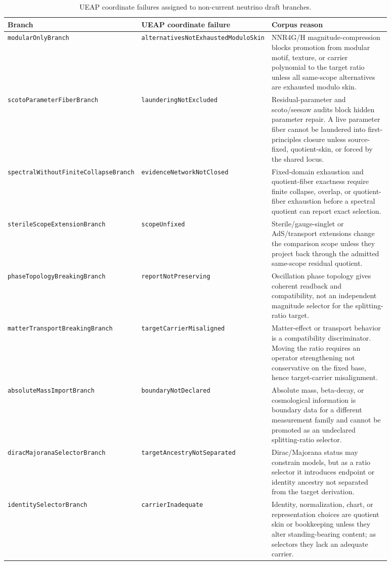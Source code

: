 \documentclass[11pt]{article}
\theoremstyle{definition}
\begin{document}
\begin{table}[htbp]
\centering
\small
\begin{tabular}{>{\raggedright\arraybackslash}p{0.24\linewidth}
                >{\raggedright\arraybackslash}p{0.25\linewidth}
                >{\raggedright\arraybackslash}p{0.39\linewidth}}
\toprule
Branch & UEAP coordinate failure & Corpus reason \\
\midrule
\texttt{modularOnlyBranch} &
\texttt{alternativesNotExhaustedModuloSkin} &
NNR4G/H magnitude-compression blocks promotion from modular motif, texture,
or carrier polynomial to the target ratio unless all same-scope alternatives
are exhausted modulo skin. \\
\addlinespace
\texttt{scotoParameterFiberBranch} &
\texttt{launderingNotExcluded} &
Residual-parameter and scoto/seesaw audits block hidden parameter repair. A
live parameter fiber cannot be laundered into first-principles closure unless
source-fixed, quotient-skin, or forced by the shared locus. \\
\addlinespace
\texttt{spectralWithoutFiniteCollapseBranch} &
\texttt{evidenceNetworkNotClosed} &
Fixed-domain exhaustion and quotient-fiber exactness require finite collapse,
overlap, or quotient-fiber exhaustion before a spectral quotient can report
exact selection. \\
\addlinespace
\texttt{sterileScopeExtensionBranch} &
\texttt{scopeUnfixed} &
Sterile/gauge-singlet or AdS/transport extensions change the comparison scope
unless they project back through the admitted same-scope residual quotient. \\
\addlinespace
\texttt{phaseTopologyBreakingBranch} &
\texttt{reportNotPreserving} &
Oscillation phase topology gives coherent readback and compatibility, not an
independent magnitude selector for the splitting-ratio target. \\
\addlinespace
\texttt{matterTransportBreakingBranch} &
\texttt{targetCarrierMisaligned} &
Matter-effect or transport behavior is a compatibility discriminator. Moving
the ratio requires an operator strengthening not conservative on the fixed
base, hence target-carrier misalignment. \\
\addlinespace
\texttt{absoluteMassImportBranch} &
\texttt{boundaryNotDeclared} &
Absolute mass, beta-decay, or cosmological information is boundary data for a
different measurement family and cannot be promoted as an undeclared
splitting-ratio selector. \\
\addlinespace
\texttt{diracMajoranaSelectorBranch} &
\texttt{targetAncestryNotSeparated} &
Dirac/Majorana status may constrain models, but as a ratio selector it
introduces endpoint or identity ancestry not separated from the target
derivation. \\
\addlinespace
\texttt{identitySelectorBranch} &
\texttt{carrierInadequate} &
Identity, normalization, chart, or representation choices are quotient skin or
bookkeeping unless they alter standing-bearing content; as selectors they lack
an adequate carrier. \\
\bottomrule
\end{tabular}
\caption{UEAP coordinate failures assigned to non-current neutrino draft
branches.}
\label{tab:branch-audit}
\end{table}
\end{document}
